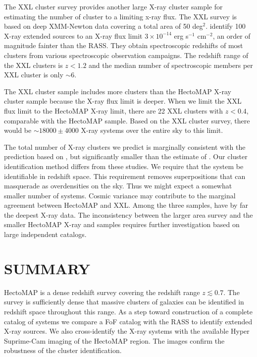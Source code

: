 \documentclass[iop, apj]{emulateapj}
\begin{document}
The XXL cluster survey \citep{Pacaud16} provides another large X-ray cluster sample
 for estimating the number of cluster to a limiting x-ray flux.
The XXL survey is based on deep XMM-Newton data covering a total area of 50 deg$^{2}$.
\citet{Pacaud16} identify 100 X-ray extended sources to an X-ray flux limit
 $3 \times 10^{-14}$ erg s$^{-1}$ cm$^{-2}$, 
 an order of magnitude fainter than the RASS. 
They obtain spectroscopic redshifts of most clusters
 from various spectroscopic observation campaigns. 
The redshift range of the XXL clusters is $z < 1.2$ and 
 the median number of spectroscopic members per XXL cluster is only $\sim 6$.

The XXL cluster sample includes more clusters than the HectoMAP X-ray cluster sample 
 because the X-ray flux limit is deeper. 
When we limit the XXL flux limit to the HectoMAP X-ray limit, 
 there are 22 XXL clusters with $z < 0.4$, 
 comparable with the HectoMAP sample. 
Based on the XXL cluster survey, 
 there would be $\sim 18000 \pm 4000$ X-ray systems over the entire sky to this limit.

The total number of X-ray clusters we predict is 
 marginally consistent with the prediction based on \citet{Pacaud16}, 
 but significantly smaller than the estimate of \citet{Schuecker04}. 
Our cluster identification method differs from these studies. 
We require that the system be identifiable in redshift space. 
This requirement removes superpositions that can masquerade as overdensities on the sky.
Thus we might expect a somewhat smaller number of systems. 
Cosmic variance may contribute to the marginal agreement between HectoMAP and XXL.
Among the three samples, \citet{Pacaud16} have by far the deepest X-ray data. 
The inconsistency between the larger area \citet{Schuecker04} survey and 
 the smaller HectoMAP X-ray and \citet{Pacaud16} samples 
 requires further investigation based on large independent catalogs.
 
 
\section{SUMMARY}\label{summary}

HectoMAP is a dense redshift survey covering the redshift range $z \lesssim 0.7$. 
The survey is sufficiently dense that 
 massive clusters of galaxies can be identified 
 in redshift space throughout this range. 
As a step toward construction of a complete catalog of systems 
 we compare a FoF catalog with the RASS 
 to identify extended X-ray sources. 
We also cross-identify the X-ray systems 
 with the available Hyper Suprime-Cam imaging of the HectoMAP region. 
The images confirm the robustness of the cluster identification.
\end{document}
